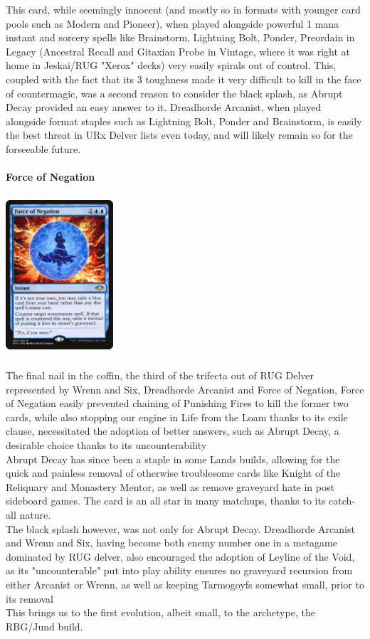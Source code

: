 \documentclass{report}
\begin{document}
This card, while seemingly innocent (and mostly so in formats with younger card pools such as Modern and Pioneer), when played alongside powerful 1 mana instant and sorcery spells like Brainstorm, Lightning Bolt, Ponder, Preordain in Legacy (Ancestral Recall and Gitaxian Probe in Vintage, where it was right at home in Jeskai/RUG "Xerox" decks) very easily spirals out of control. This, coupled with the fact that its 3 toughness made it very difficult to kill in the face of countermagic, was a second reason to consider the black splash, as Abrupt Decay provided an easy answer to it. Dreadhorde Arcanist, when played alongside format staples such as Lightning Bolt, Ponder and Brainstorm,  is easily the best threat in URx Delver lists even today, and will likely remain so for the forseeable future. \\\\
\textbf{Force of Negation\\}
\begin{center}
\includegraphics [width = 4cm, height = 6cm] {force-of-negation}
\end{center}
The final nail in the coffin, the third of the trifecta out of RUG Delver represented by Wrenn and Six, Dreadhorde Arcanist and Force of Negation, Force of Negation easily prevented chaining of Punishing Fires to kill the former two cards, while also stopping our engine in Life from the Loam thanks to its exile clause, necessitated the adoption of better answers, such as Abrupt Decay, a desirable choice thanks to its uncounterability \\
Abrupt Decay has since been a staple in some Lands builds, allowing for the quick and painless removal of otherwise troublesome cards like Knight of the Reliquary and Monastery Mentor, as well as remove graveyard hate in post sideboard games. The card is an all star in many matchups, thanks to its catch-all nature.\\
The black splash however, was not only for Abrupt Decay. Dreadhorde Arcanist and Wrenn and Six, having become both enemy number one in a metagame dominated by RUG delver, also encouraged the adoption of Leyline of the Void, as its "uncounterable" put into play ability ensures no graveyard recursion from either Arcanist or Wrenn, as well as keeping Tarmogoyfs somewhat small, prior to its removal\\
This brings us to the first evolution, albeit small, to the archetype, the RBG/Jund build.
\end{document}
